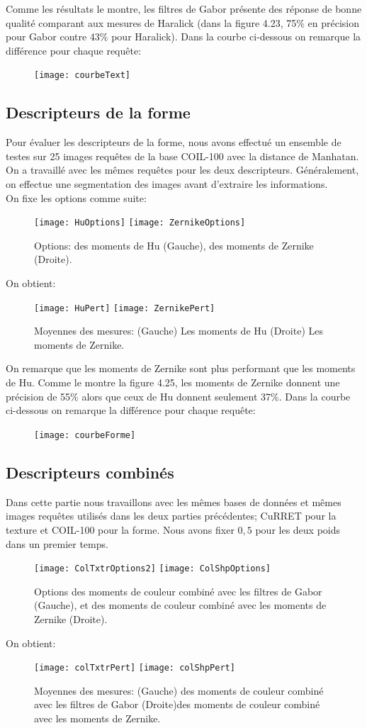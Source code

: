 Comme les résultats le montre, les filtres de Gabor présente des réponse de bonne qualité comparant aux mesures de Haralick (dans la figure 4.23, 75\% en précision pour Gabor contre 43\% pour Haralick). Dans la courbe ci-dessous on remarque la différence pour chaque requête:
\begin{figure}[H]
	\centering
	\texttt{[image: courbeText]}
\end{figure}
\subsection{Descripteurs de la forme}
Pour évaluer les descripteurs de la forme, nous avons effectué un ensemble de testes sur 25 images requêtes de la base COIL-100 avec la distance de Manhatan. On a travaillé avec les mêmes requêtes pour les deux descripteurs. Généralement, on effectue une segmentation des images avant d'extraire les informations.\\

On fixe les options comme suite:
\begin{figure}[H]
	\centering
	\texttt{[image: HuOptions]} \space
	\texttt{[image: ZernikeOptions]} 
	\caption{Options: des moments de Hu (Gauche), des moments de Zernike (Droite).}
\end{figure}
On obtient:
\begin{figure}[H]
	\centering
	\texttt{[image: HuPert]} \space \space 
	\texttt{[image: ZernikePert]}
	\caption{Moyennes des mesures: (Gauche) Les moments de Hu (Droite) Les moments de Zernike.}
\end{figure}


On remarque que les moments de Zernike sont plus performant que les moments de Hu. Comme le montre la figure 4.25, les moments de Zernike donnent une précision de 55\% alors que ceux de Hu donnent seulement 37\%. Dans la courbe ci-dessous on remarque la différence pour chaque requête:
\begin{figure}[H]
	\centering
	\texttt{[image: courbeForme]}
\end{figure}
\subsection{Descripteurs combinés}
Dans cette partie nous travaillons avec les mêmes bases de données et mêmes images requêtes utilisés dans les deux parties précédentes; CuRRET pour la texture et COIL-100 pour la forme. Nous avons fixer $  0,5 $ pour les deux poids dans un premier temps.
\begin{figure}[H]
	\centering
	\texttt{[image: ColTxtrOptions2]} \space
	\texttt{[image: ColShpOptions]} 
	\caption{Options des moments de couleur combiné avec les filtres de Gabor (Gauche), et des moments de couleur combiné avec les moments de Zernike (Droite).}
\end{figure}
On obtient:
\begin{figure}[H]
	\centering
	\texttt{[image: colTxtrPert]} \space \space
	\texttt{[image: colShpPert]} 
	\caption{Moyennes des mesures: 
		(Gauche) des moments de couleur combiné avec les filtres de Gabor (Droite)des moments de couleur combiné avec les moments de Zernike.}
\end{figure}

